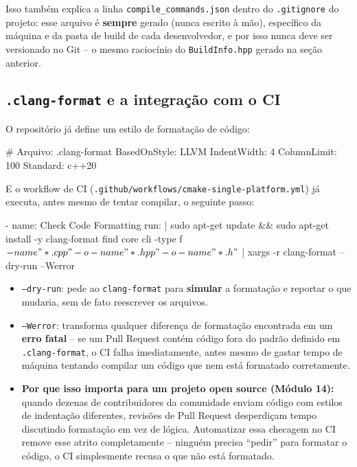 \begin{CaixaInfo}
Isso também explica a linha \texttt{compile\_commands.json} dentro do \texttt{.gitignore} do projeto: esse arquivo é \textbf{sempre} gerado (nunca escrito à mão), específico da máquina e da pasta de build de cada desenvolvedor, e por isso nunca deve ser versionado no Git -- o mesmo raciocínio do \texttt{BuildInfo.hpp} gerado na seção anterior.
\end{CaixaInfo}

\subsection{\texttt{.clang-format} e a integração com o CI}

O repositório já define um estilo de formatação de código:

\begin{CaixaCodigo}
# Arquivo: .clang-format
BasedOnStyle: LLVM
IndentWidth: 4
ColumnLimit: 100
Standard: c++20
\end{CaixaCodigo}

E o workflow de CI (\texttt{.github/workflows/cmake-single-platform.yml}) já executa, antes mesmo de tentar compilar, o seguinte passo:

\begin{CaixaCodigo}
- name: Check Code Formatting
  run: |
    sudo apt-get update && sudo apt-get install -y clang-format
    find core cli -type f \( -name "*.cpp" -o -name "*.hpp" -o -name "*.h" \) | xargs -r clang-format --dry-run --Werror
\end{CaixaCodigo}

\begin{itemize}
    \item \texttt{--dry-run}: pede ao \texttt{clang-format} para \textbf{simular} a formatação e reportar o que mudaria, sem de fato reescrever os arquivos.
    \item \texttt{--Werror}: transforma qualquer diferença de formatação encontrada em um \textbf{erro fatal} -- se um Pull Request contém código fora do padrão definido em \texttt{.clang-format}, o CI falha imediatamente, antes mesmo de gastar tempo de máquina tentando compilar um código que nem está formatado corretamente.
    \item \textbf{Por que isso importa para um projeto open source (Módulo 14):} quando dezenas de contribuidores da comunidade enviam código com estilos de indentação diferentes, revisões de Pull Request desperdiçam tempo discutindo formatação em vez de lógica. Automatizar essa checagem no CI remove esse atrito completamente -- ninguém precisa ``pedir'' para formatar o código, o CI simplesmente recusa o que não está formatado.
\end{itemize}

